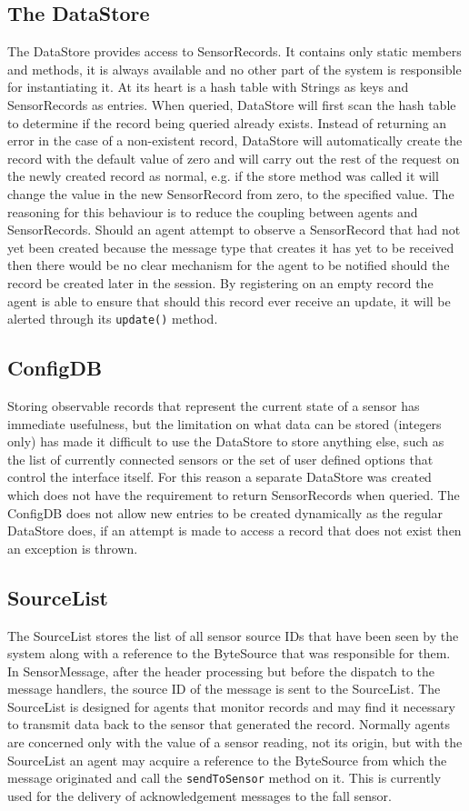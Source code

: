 \documentclass[conference,a4paper]{IEEEtran}
\begin{document}
\subsection{The DataStore}
The DataStore provides access to SensorRecords. It contains only static members and methods, it is always available and no other part of the system is responsible for instantiating it. At its heart is a hash table with Strings as keys and SensorRecords as entries. 
When queried, DataStore will first scan the hash table to determine if the record being queried already exists. Instead of returning an error in the case of a non-existent record, DataStore will automatically create the record with the default value of zero and will carry out the rest of the request on the newly created record as normal, e.g. if the store method was called it will change the value in the new SensorRecord from zero, to the specified value. The reasoning for this behaviour is to reduce the coupling between agents and SensorRecords. Should an agent attempt to observe a SensorRecord that had not yet been created because the message type that creates it has yet to be received then there would be no clear mechanism for the agent to be notified should the record be created later in the session. By registering on an empty record the agent is able to ensure that should this record ever receive an update, it will be alerted through its \verb#update()# method.

\subsection{ConfigDB}
Storing observable records that represent the current state of a sensor has immediate usefulness, but the limitation on what data can be stored (integers only) has made it difficult to use the DataStore to store anything else, such as the list of currently connected sensors or the set of user defined options that control the interface itself. For this reason a separate DataStore was created which does not have the requirement to return SensorRecords when queried. The ConfigDB does not allow new entries to be created dynamically as the regular DataStore does, if an attempt is made to access a record that does not exist then an exception is thrown.

\subsection{SourceList}
The SourceList stores the list of all sensor source IDs that have been seen by the system along with a reference to the ByteSource that was responsible for them. In SensorMessage, after the header processing but before the dispatch to the message handlers, the source ID of the message is sent to the SourceList. The SourceList is designed for agents that monitor records and may find it necessary to transmit data back to the sensor that generated the record. Normally agents are concerned only with the value of a sensor reading, not its origin, but with the SourceList an agent may acquire a reference to the ByteSource from which the message originated and call the \verb#sendToSensor# method on it. This is currently used for the delivery of acknowledgement messages to the fall sensor.
\end{document}
